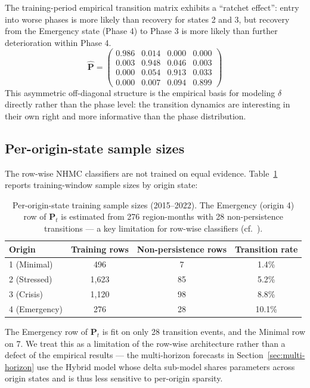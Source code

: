 \documentclass[11pt,letterpaper]{article}
\begin{document}
The training-period empirical transition matrix exhibits a ``ratchet effect'': entry into worse phases is more likely than recovery for states 2 and 3, but recovery from the Emergency state (Phase 4) to Phase 3 is more likely than further deterioration within Phase 4.
\[
\hat{\mathbf{P}} = \begin{pmatrix}
  0.986 & 0.014 & 0.000 & 0.000 \\
  0.003 & 0.948 & 0.046 & 0.003 \\
  0.000 & 0.054 & 0.913 & 0.033 \\
  0.000 & 0.007 & 0.094 & 0.899
\end{pmatrix}
\]
This asymmetric off-diagonal structure is the empirical basis for modeling $\delta$ directly rather than the phase level: the transition dynamics are interesting in their own right and more informative than the phase distribution.

\subsection{Per-origin-state sample sizes}\label{sec:per-origin}

The row-wise NHMC classifiers are not trained on equal evidence. Table~\ref{tab:per-origin} reports training-window sample sizes by origin state:

\begin{table}[H]
\centering
\small
\caption{Per-origin-state training sample sizes (2015--2022). The Emergency (origin 4) row of $\mathbf{P}_t$ is estimated from 276 region-months with 28 non-persistence transitions --- a key limitation for row-wise classifiers (cf.\ \citet{bartolucci2019}).}
\label{tab:per-origin}
\begin{tabular}{lccc}
\toprule
\textbf{Origin} & \textbf{Training rows} & \textbf{Non-persistence rows} & \textbf{Transition rate} \\
\midrule
1 (Minimal)   &   496 &   7 &  1.4\% \\
2 (Stressed)  & 1,623 &  85 &  5.2\% \\
3 (Crisis)    & 1,120 &  98 &  8.8\% \\
4 (Emergency) &   276 &  28 & 10.1\% \\
\bottomrule
\end{tabular}
\end{table}

\noindent The Emergency row of $\mathbf{P}_t$ is fit on only 28 transition events, and the Minimal row on 7. We treat this as a limitation of the row-wise architecture rather than a defect of the empirical results --- the multi-horizon forecasts in Section~\ref{sec:multi-horizon} use the Hybrid model whose delta sub-model shares parameters across origin states and is thus less sensitive to per-origin sparsity.
\end{document}
